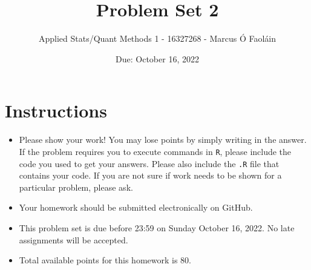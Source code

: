 \documentclass[12pt,letterpaper]{article}
\title{Problem Set 2}
\date{Due: October 16, 2022}
\author{Applied Stats/Quant Methods 1 - 16327268 - Marcus Ó Faoláin}
\begin{document}
	\maketitle
	\section*{Instructions}
\begin{itemize}
	\item Please show your work! You may lose points by simply writing in the answer. If the problem requires you to execute commands in \texttt{R}, please include the code you used to get your answers. Please also include the \texttt{.R} file that contains your code. If you are not sure if work needs to be shown for a particular problem, please ask.
	\item Your homework should be submitted electronically on GitHub.
	\item This problem set is due before 23:59 on Sunday October 16, 2022. No late assignments will be accepted.
	\item Total available points for this homework is 80.
\end{itemize}

	
	\vspace{.5cm}
\end{document}
